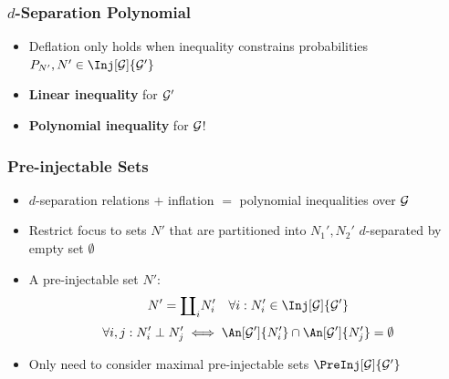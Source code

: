 \documentclass[
    hyperref={bookmarks=false},%
    xcolor={dvipsnames},
]{beamer}
\renewcommand{\term}[1]{\textcolor{Mahogany}{#1}}
\begin{document}
\begin{frame}
    \frametitle{$d$-Separation Polynomial}
    \begin{itemize}
        \item Deflation only holds when inequality constrains probabilities $\prob[N'], N' \in \Inj[\graph]{\graph'}$
        \item \textbf{Linear inequality} for $\mathcal{G}'$
    \end{itemize}
    \begin{center}
    \end{center}
    \begin{itemize}
        \item \textbf{Polynomial inequality} for $\mathcal{G}$!
    \end{itemize}
\end{frame}

\begin{frame}
    \frametitle{Pre-injectable Sets}
    \begin{itemize}
        \item $d$-separation relations $+$ inflation $=$ polynomial inequalities over $\mathcal{G}$
        \item Restrict focus to sets $N'$ that are partitioned into $N_1', N_2'$ $d$-separated by empty set $\emptyset$
        \item A \term{pre-injectable set} $N'$:
        \[ N' = {\coprod}_i N_i' \quad \forall i: N_i' \in \Inj[\graph]{\graph'} \]
        \[ \forall i, j : N_i' \ancestralindep N_j' \iff \An[\graph']{N'_i} \cap \An[\graph']{N'_j} = \emptyset \]
        \item Only need to consider \term{maximal pre-injectable sets} $\PreInj[\graph]{\graph'}$
    \end{itemize}
\end{frame}
\end{document}
